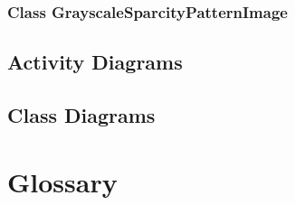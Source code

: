 \documentclass[parskip=full]{scrartcl}
\begin{document}
\subsubsection{Class GrayscaleSparcityPatternImage}

\subsection{Activity Diagrams}



\subsection{Class Diagrams}





\section{Glossary}

%
\printnoidxglossaries
\end{document}
